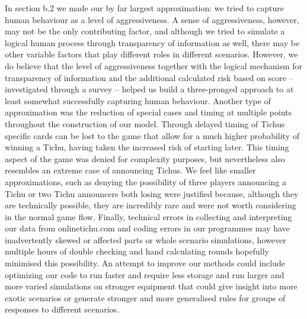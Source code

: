 In section b.2 we made our by far largest approximation: we tried to capture human behaviour as a level of aggressiveness. A sense of aggressiveness, however, may not be the only contributing factor, and although we tried to simulate a logical human process through transparency of information as well, there may be other variable factors that play different roles in different scenarios. However, we do believe that the level of aggressiveness together with the logical mechanism for transparency of information and the additional calculated risk based on score –  investigated through a survey – helped us build a three-pronged approach to at least somewhat successfully capturing human behaviour. Another type of approximation was the reduction of special cases and timing at multiple points throughout the construction of our model. Through delayed timing of Tichus specific cards can be lost to the game that allow for a much higher probability of winning a Tichu, having taken the increased risk of starting later. This timing aspect of the game was denied for complexity purposes, but nevertheless also resembles an extreme case of announcing Tichus. We feel like smaller approximations, such as denying the possibility of three players announcing a Tichu or two Tichu announcers both losing were justified because, although they are technically possible, they are incredibly rare and were not worth considering in the normal game flow. Finally, technical errors in collecting and interpreting our data from onlinetichu.com and coding errors in our programmes may have inadvertently skewed or affected parts or whole scenario simulations, however multiple hours of double checking and hand calculating rounds hopefully minimised this possibility. An attempt to improve our methods could include optimizing our code to run faster and require less storage and run larger and more varied simulations on stronger equipment that could give insight into more exotic scenarios or generate stronger and more generalised rules for groups of responses to different scenarios.

